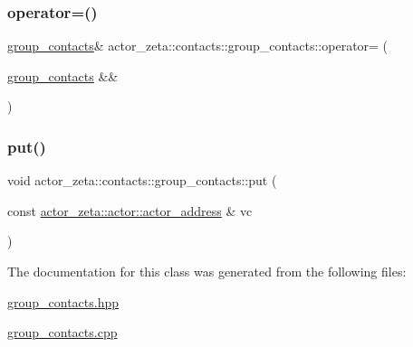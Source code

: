 \subsubsection{\texorpdfstring{operator=()}{operator=()}}
{\footnotesize\ttfamily \hyperlink{classactor__zeta_1_1contacts_1_1group__contacts}{group\+\_\+contacts}\& actor\+\_\+zeta\+::contacts\+::group\+\_\+contacts\+::operator= (\begin{DoxyParamCaption}\item[{\hyperlink{classactor__zeta_1_1contacts_1_1group__contacts}{group\+\_\+contacts} \&\&}]{ }\end{DoxyParamCaption})\hspace{0.3cm}{\ttfamily [default]}}

\mbox{\label{classactor__zeta_1_1contacts_1_1group__contacts_a3f3df67c28107e37cd14669e86139da2}} 
\subsubsection{\texorpdfstring{put()}{put()}}
{\footnotesize\ttfamily void actor\+\_\+zeta\+::contacts\+::group\+\_\+contacts\+::put (\begin{DoxyParamCaption}\item[{const \hyperlink{classactor__zeta_1_1actor_1_1actor__address}{actor\+\_\+zeta\+::actor\+::actor\+\_\+address} \&}]{vc }\end{DoxyParamCaption})}



The documentation for this class was generated from the following files\+:\begin{DoxyCompactItemize}
\item 
\hyperlink{group__contacts_8hpp}{group\+\_\+contacts.\+hpp}\item 
\hyperlink{group__contacts_8cpp}{group\+\_\+contacts.\+cpp}\end{DoxyCompactItemize}
